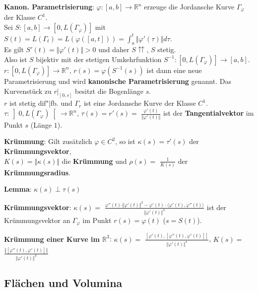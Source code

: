\textbf{Kanon. Parametrisierung}:
$\varphi: [a,b] \rightarrow \mathbb{R}^n$ erzeuge die
Jordansche Kurve $\Gamma_\varphi$ der Klasse $C^1$. \\
Sei $S: [a,b] \rightarrow [0, L(\Gamma_\varphi)]$ mit
$S(t) = L(\Gamma_t) = L(\varphi([a,t])) =
\int_a^t \Vert \varphi'(\tau) \Vert d \tau$. \\
Es gilt $S'(t) = \Vert \varphi'(t) \Vert > 0$ und daher
$S\!\!\upuparrows$, $S$ stetig. \\
Also ist $S$ bijektiv mit der stetigen Umkehrfunktion
$S^{-1}: [0, L(\Gamma_\varphi)] \rightarrow [a,b]$. \\
$r: [0, L(\Gamma_\varphi)] \rightarrow \mathbb{R}^n$,
$r(s) = \varphi(S^{-1}(s))$ ist dann eine neue Parametrisierung und wird
\textbf{kanonische Parametrisierung} genannt.
Das Kurvenstück zu $r|_{[0,s]}$ besitzt die Bogenlänge $s$. \\
$r$ ist stetig dif"|fb. und $\Gamma_r$ ist eine Jordansche Kurve der Klasse
$C^1$. \\
$\tau: \left]0, L(\Gamma_\varphi)\right[ \rightarrow \mathbb{R}^n$,
$\tau(s) = r'(s) =$ {\large $\frac{\varphi'(t)}{\Vert \varphi'(t) \Vert}$}
ist der \textbf{Tangentialvektor} im Punkt $s$ (Länge $1$).

\linie

\textbf{Krümmung}: Gilt zusätzlich $\varphi \in C^2$, so ist
$\kappa(s) = \tau'(s)$ der \textbf{Krümmungsvektor}, \\
$K(s) = \Vert \kappa(s) \Vert$ die \textbf{Krümmung} und
$\rho(s) =$ {\large $\frac{1}{K(s)}$} der \textbf{Krümmungsradius}.

\textbf{Lemma}: $\kappa(s) \;\bot\; \tau(s)$

\pagebreak

\textbf{Krümmungsvektor}:
$\kappa(s) =$ {\large $\frac{\varphi''(t) \cdot \Vert \varphi'(t) \Vert^2 -
\varphi'(t) \cdot \langle \varphi'(t), \varphi''(t) \rangle}
{\Vert \varphi'(t) \Vert^4}$} ist der Krümmungsvektor an $\Gamma_\varphi$
im Punkt $r(s) = \varphi(t)$ ($s = S(t)$).

\textbf{Krümmung einer Kurve im $\mathbb{R}^3$}:
$\kappa(s) =$ {\large $\frac{[\varphi'(t), [\varphi''(t), \varphi'(t)]]}
{\Vert \varphi'(t) \Vert^4}$}, \quad
$K(s) =$ {\large $\frac{\Vert [\varphi''(t), \varphi'(t)] \Vert}
{\Vert \varphi'(t) \Vert^3}$}

\subsection{%
    Flächen und Volumina%
}

